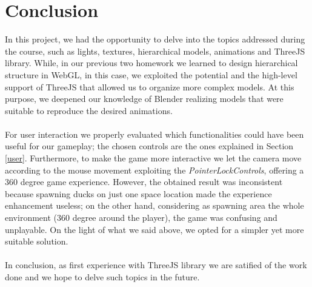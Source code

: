 \documentclass[12pt,a4paper]{article}
\begin{document}
	\section{Conclusion}
	In this project, we had the opportunity to delve into the topics 
	addressed during the course, such as lights, textures, hierarchical 
	models, animations and ThreeJS library.
	While, in our previous two homework we learned to design hierarchical
	structure in WebGL, in this case, we exploited the potential and the 
	high-level support of ThreeJS that allowed us to organize more complex
	models. At this purpose, we deepened our knowledge of Blender realizing
	models that were suitable to reproduce the desired animations.
	\\ \\ 
	For user interaction we properly evaluated which 
	functionalities could have been useful for our gameplay; the
	chosen controls are the ones explained in Section \ref{user}. 
	Furthermore, to make the game more interactive we let
	the camera move according to the mouse movement exploiting the
	\textit{PointerLockControls}, offering a 360 degree game experience.
	However, the obtained result was inconsistent because spawning ducks
	on just one space location made the experience enhancement 
	useless; on the other hand, considering as spawning area the whole 
	environment (360 degree around the player), the game was confusing and
	unplayable. On the light of what we said above, we opted for a simpler
	yet more suitable solution. 
	\\ \\ 
	In conclusion, as first experience with ThreeJS library we 
	are satified of the work done and we hope to delve such topics in the 
	future.
\end{document}
